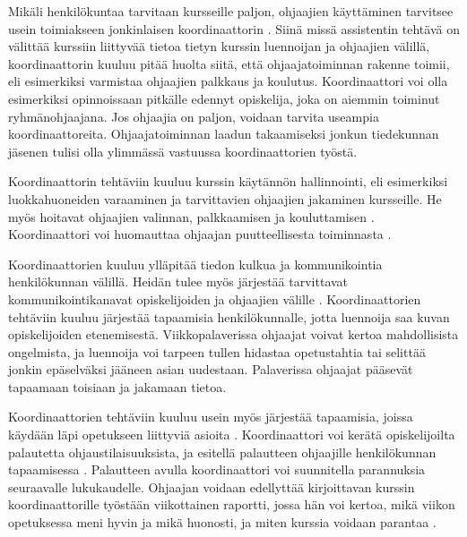 \documentclass[finnish]{tktltiki2}
\theoremstyle{definition}
\theoremstyle{remark}
\begin{document}
Mikäli henkilökuntaa tarvitaan kursseille paljon, ohjaajien käyttäminen tarvitsee usein toimiakseen jonkinlaisen koordinaattorin \cite{Roberts95}. Siinä missä assistentin tehtävä on välittää kurssiin liittyvää tietoa tietyn kurssin luennoijan ja ohjaajien välillä, koordinaattorin kuuluu pitää huolta siitä, että ohjaajatoiminnan rakenne toimii, eli esimerkiksi varmistaa ohjaajien palkkaus ja koulutus. Koordinaattori voi olla esimerkiksi opinnoissaan pitkälle edennyt opiskelija, joka on aiemmin toiminut ryhmänohjaajana. Jos ohjaajia on paljon, voidaan tarvita useampia koordinaattoreita. Ohjaajatoiminnan laadun takaamiseksi jonkun tiedekunnan jäsenen tulisi olla ylimmässä vastuussa koordinaattorien työstä. \par

Koordinaattorin tehtäviin kuuluu kurssin käytännön hallinnointi, eli esimerkiksi luokkahuoneiden varaaminen ja tarvittavien ohjaajien jakaminen kursseille. He myös hoitavat ohjaajien valinnan, palkkaamisen ja kouluttamisen \cite{Reges88,Roberts95}. Koordinaattori voi huomauttaa ohjaajan puutteellisesta toiminnasta \cite{Reges88}. \par

Koordinaattorien kuuluu ylläpitää tiedon kulkua ja kommunikointia henkilökunnan välillä. Heidän tulee myös järjestää tarvittavat kommunikointikanavat opiskelijoiden ja ohjaajien välille \cite{Reges88}. Koordinaattorien tehtäviin kuuluu järjestää tapaamisia henkilökunnalle, jotta luennoija saa kuvan opiskelijoiden etenemisestä. Viikkopalaverissa ohjaajat voivat kertoa mahdollisista ongelmista, ja luennoija voi tarpeen tullen hidastaa opetustahtia tai selittää jonkin epäselväksi jääneen asian uudestaan. Palaverissa ohjaajat pääsevät tapaamaan toisiaan ja jakamaan tietoa.  \par

Koordinaattorien tehtäviin kuuluu usein myös järjestää tapaamisia, joissa käydään läpi opetukseen liittyviä asioita \cite{Reges88, Roberts95}. Koordinaattori voi kerätä opiskelijoilta palautetta ohjaustilaisuuksista, ja esitellä palautteen ohjaajille henkilökunnan tapaamisessa \cite{Patitsas12_2}. Palautteen avulla koordinaattori voi suunnitella parannuksia seuraavalle lukukaudelle. Ohjaajan voidaan edellyttää kirjoittavan kurssin koordinaattorille työstään viikottainen raportti, jossa hän voi kertoa, mikä viikon opetuksessa meni hyvin ja mikä huonosti, ja miten kurssia voidaan parantaa \cite{Hug11}. \par
\end{document}
